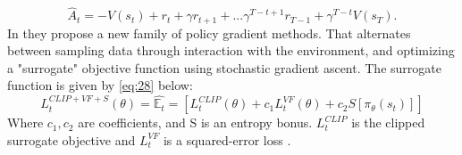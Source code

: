 \documentclass{kththesis}
\theoremstyle{definition}
\begin{document}
\begin{equation}
    \label{eq:27}
    \hat{A}_{t} = -V(s_t) + r_t +\gamma r_{t+1} + ... \gamma^{T-t+1} r_{T-1} + \gamma^{T-t}V(s_T).
\end{equation}
In \textcite{schulman2017proximal} they propose a new family of policy gradient methods. That alternates between sampling data through interaction with the environment, and optimizing a "surrogate" objective function using stochastic gradient ascent.  The surrogate function is given by \autoref{eq:28} below: 
\begin{equation}
    \label{eq:28}
    L_{t}^{CLIP + VF+ S}(\theta) = \hat{\mathbb{E}_{t}} = \left[L_{t}^{CLIP}(\theta) + c_1 L_{t}^{VF}(\theta) + c_2S[\pi_{\theta}(s_t)]\right]
\end{equation}
Where $c_1,c_2$ are coefficients, and S is an entropy bonus. $L_{t}^{CLIP}$ is the clipped surrogate objective and $L_{t}^{VF}$ is a squared-error loss \parencite{schulman2017proximal}.

\end{document}
